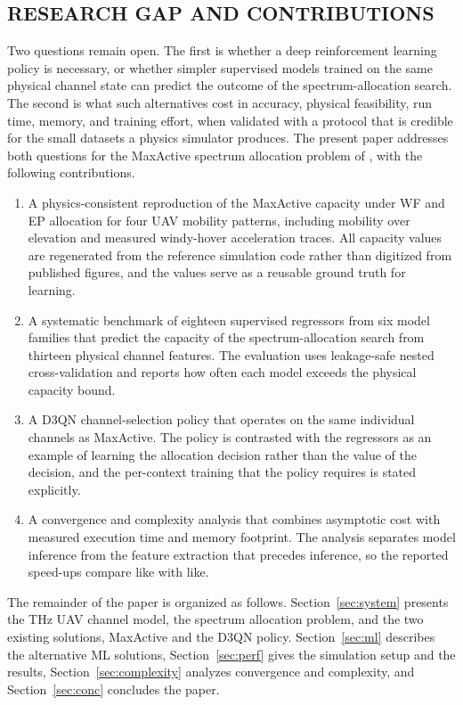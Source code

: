 \documentclass{ieee-ojvt}
\begin{document}
\subsection{RESEARCH GAP AND CONTRIBUTIONS}
\label{sec:contrib}
Two questions remain open. The first is whether a deep reinforcement learning policy is
necessary, or whether simpler supervised models trained on the same physical channel state
can predict the outcome of the spectrum-allocation search. The second is what such
alternatives cost in accuracy, physical feasibility, run time, memory, and training
effort, when validated with a protocol that is credible for the small datasets a physics
simulator produces. The present paper addresses both questions for the MaxActive spectrum
allocation problem of \cite{10399804}, with the following contributions.
\begin{enumerate}
\def\labelenumi{\arabic{enumi})}
\item A physics-consistent reproduction of the MaxActive capacity under WF and EP
allocation for four UAV mobility patterns, including mobility over elevation and measured
windy-hover acceleration traces. All capacity values are regenerated from the reference
simulation code rather than digitized from published figures, and the values serve as a
reusable ground truth for learning.
\item A systematic benchmark of eighteen supervised regressors from six model families
that predict the capacity of the spectrum-allocation search from thirteen physical
channel features. The evaluation uses leakage-safe nested cross-validation and reports
how often each model exceeds the physical capacity bound.
\item A D3QN channel-selection policy that operates on the same individual channels as
MaxActive. The policy is contrasted with the regressors as an example of learning the
allocation decision rather than the value of the decision, and the per-context training
that the policy requires is stated explicitly.
\item A convergence and complexity analysis that combines asymptotic cost with measured
execution time and memory footprint. The analysis separates model inference from the
feature extraction that precedes inference, so the reported speed-ups compare like with
like.
\end{enumerate}

The remainder of the paper is organized as follows. Section~\ref{sec:system} presents the
THz UAV channel model, the spectrum allocation problem, and the two existing solutions,
MaxActive and the D3QN policy. Section~\ref{sec:ml} describes the alternative ML
solutions, Section~\ref{sec:perf} gives the simulation setup and the results,
Section~\ref{sec:complexity} analyzes convergence and complexity, and
Section~\ref{sec:conc} concludes the paper.
\end{document}
